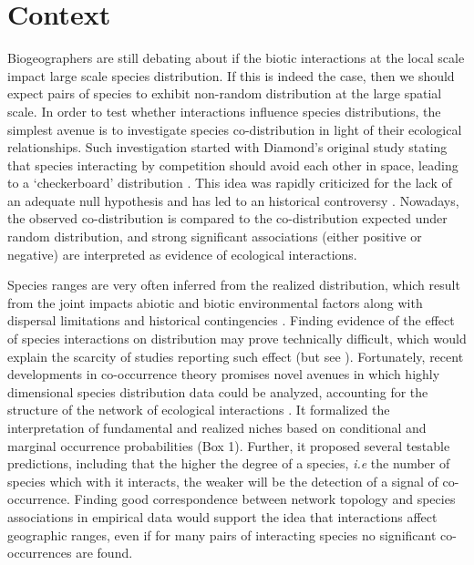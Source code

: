 \section{Context}\label{context}

Biogeographers are still debating about if the biotic interactions at
the local scale impact large scale species distribution. If this is
indeed the case, then we should expect pairs of species to exhibit
non-random distribution at the large spatial scale. In order to test
whether interactions influence species distributions, the simplest
avenue is to investigate species co-distribution in light of their
ecological relationships. Such investigation started with Diamond's
original study stating that species interacting by competition should
avoid each other in space, leading to a `checkerboard' distribution
\citep{Diamond1975}. This idea was rapidly criticized for the lack of an
adequate null hypothesis \citep{Connor1979, Gilpin1982} and has led to
an historical controversy \citep{Hutchinson1959}. Nowadays, the observed
co-distribution is compared to the co-distribution expected under random
distribution, and strong significant associations (either positive or
negative) are interpreted as evidence of ecological interactions.

Species ranges are very often inferred from the realized distribution,
which result from the joint impacts abiotic and biotic environmental
factors along with dispersal limitations and historical contingencies
\citep{Pulliam2000, Holt2009, Araujo2014}. Finding evidence of the
effect of species interactions on distribution may prove technically
difficult, which would explain the scarcity of studies reporting such
effect (but see \citet{Gotelli2010}). Fortunately, recent developments
in co-occurrence theory promises novel avenues in which highly
dimensional species distribution data could be analyzed, accounting for
the structure of the network of ecological interactions
\citep{Cazelles2016}. It formalized the interpretation of fundamental
and realized niches based on conditional and marginal occurrence
probabilities (Box 1). Further, it proposed several testable
predictions, including that the higher the degree of a species,
\emph{i.e} the number of species which with it interacts, the weaker
will be the detection of a signal of co-occurrence. Finding good
correspondence between network topology and species associations in
empirical data would support the idea that interactions affect
geographic ranges, even if for many pairs of interacting species no
significant co-occurrences are found.

